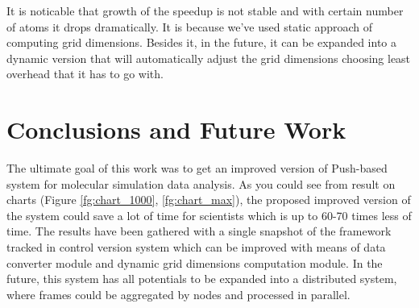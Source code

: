 \documentclass[11pt,a4paper]{report}
\begin{document}
It is noticable that growth of the speedup is not stable and with certain number of atoms it drops dramatically. It is because we've used static approach of computing grid dimensions. Besides it, in the future, it can be expanded into a dynamic version that will automatically adjust the grid dimensions choosing least overhead that it has to go with.


\chapter{Conclusions and Future Work}\label{sc:conclusion}
The ultimate goal of this work was to get an improved version of Push-based system for molecular simulation data analysis. As you could see from result on charts (Figure \ref{fg:chart_1000}, \ref{fg:chart_max}), the proposed improved version of the system could save a lot of time for scientists which is up to 60-70 times less of time. The results have been gathered with a single snapshot of the framework tracked in control version system which can be improved with means of data converter module and dynamic grid dimensions computation module. In the future, this system has all potentials to be expanded into a distributed system, where frames could be aggregated by nodes and processed in parallel.\\

%


\end{document}
